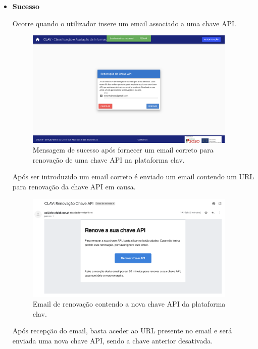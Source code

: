 \begin{itemize}
    \item \textbf{Sucesso}
    
    Ocorre quando o utilizador insere um email associado a uma chave API.
    
    \begin{figure}[H]
        \centering
        \includegraphics[width=0.95\textwidth]{img/clav/authAPI/sucessoRenovacao.png}
        \caption{Mensagem de sucesso após fornecer um email correto para renovação de uma chave API na plataforma \gls{clav}.}
        \label{fig:renovarChaveApiSucesso}
    \end{figure}
    
    Após ser introduzido um email correto é enviado um email contendo um URL para renovação da chave API em causa.
    
    \begin{figure}[H]
        \centering
        \includegraphics[width=0.95\textwidth]{img/clav/authAPI/emailRenovar.png}
        \caption{Email de renovação contendo a nova chave API da plataforma \gls{clav}.}
        \label{fig:emailRenovacaoChaveApi}
    \end{figure}
    
    Após recepção do email, basta aceder ao URL presente no email e será enviada uma nova chave API, sendo a chave anterior desativada.
    

\end{itemize}
